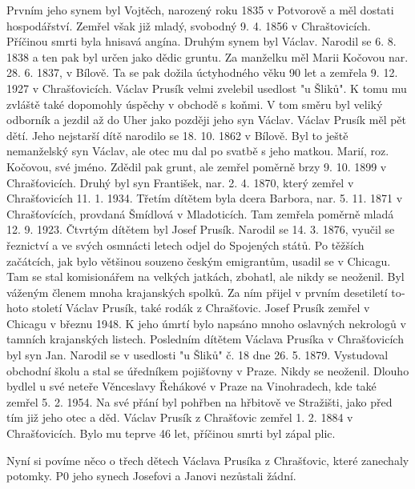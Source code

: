 \documentclass[../dejiny-rodu-prusiku.tex]{subfiles}
\begin{document}
Prvním jeho synem byl Vojtěch, narozený roku 1835 v Potvorově a měl dostati hospodářství. Zemřel však již mladý, svobodný 9. 4. 1856 v Chraštovicích. Příčinou smrti byla hnisavá angína. Druhým synem byl Václav. Narodil se 6. 8. 1838 a ten pak byl určen jako dědic gruntu. Za manželku měl Marii Kočovou nar. 28. 6. 1837, v Bílově. Ta se pak dožila úctyhodného věku 90 let a zemřela 9. 12. 1927 v Chrašťovicích. Václav Prusík velmi zvelebil used­lost "u Šliků". K tomu mu zvláště také dopomohly úspě­chy v obchodě s koňmi. V tom směru byl veliký odborník a jezdil až do Uher jako později jeho syn Václav. Václav Prusík měl pět dětí. Jeho nejstarší dítě narodilo se 18. 10. 1862 v Bílově. Byl to ještě nemanželský syn Václav,
ale otec mu dal po svatbě s jeho matkou. Marií, roz. Kočovou, své jméno. Zdědil pak grunt, ale zemřel po­měrně brzy 9. 10. 1899 v Chrašťovicích. Druhý byl syn František, nar. 2. 4. 1870, který zemřel v Chrašťovicích 11. 1. 1934. Třetím dítětem byla dcera Barbora, nar. 5. 11. 1871 v Chrašťovících, provdaná Šmídlová v Mladoticích. Tam zemřela poměrně mladá 12. 9. 1923. Čtvrtým dítětem byl Josef Prusík. Narodil se 14. 3. 1876, vyu­čil se řeznictví a ve svých osmnácti letech odjel do Spojených států. Po těžších začátcích, jak bylo větši­nou souzeno českým emigrantům, usadil se v Chicagu. Tam se stal komisionářem na velkých jatkách, zbohatl, ale nikdy se neoženil. Byl váženým členem mnoha kra­janských spolků. Za ním přijel v prvním desetiletí to­hoto století Václav Prusík, také rodák z Chrašťovic. Josef Prusík zemřel v Chicagu v březnu 1948. K jeho úmrtí bylo napsáno mnoho oslavných nekrologů v tamních krajanských listech. Posledním dítětem Václava Prusíka v Chrašťovicích byl syn Jan. Narodil se v usedlosti "u Šliků" č. 18 dne 26. 5. 1879. Vystudoval obchodní školu a stal se úředníkem pojišťovny v Praze. Nikdy se neoženil. Dlouho bydlel u své neteře Věnceslavy Řehákové v Praze na Vinohradech, kde také zemřel 5. 2. 1954. Na své přání byl pohřben na hřbitově ve Stražišti, jako před tím již jeho otec a děd. Václav Prusík z Chrašťovic zemřel 1. 2. 1884 v Chrašťovicích. Bylo mu teprve 46 let, příčinou smrti byl zápal plic.

Nyní si povíme něco o třech dětech Václava Prusíka z Chrašťovic, které zanechaly potomky. P0 jeho synech Josefovi a Janovi nezůstali žádní.
\end{document}

